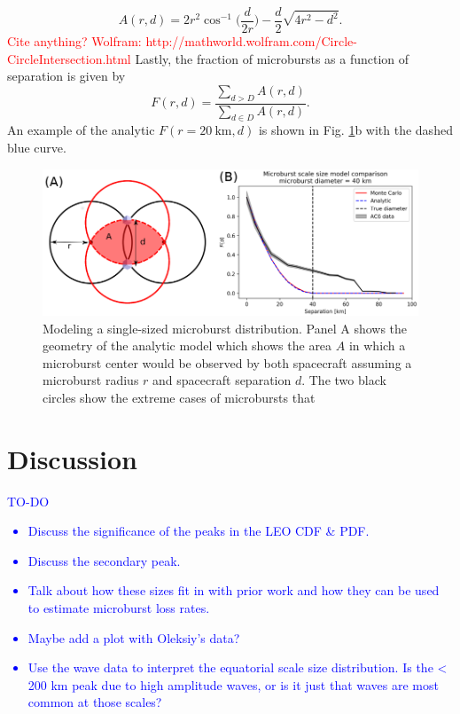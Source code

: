 \documentclass[draft]{agujournal2019}
\begin{document}
\begin{equation}
A(r, d) = 2r^2 \cos^{-1}{\Big( \frac{d}{2r} \Big)} - \frac{d}{2} \sqrt{4r^2 - d^2}.
\end{equation} \textcolor{red}{Cite anything? Wolfram: http://mathworld.wolfram.com/Circle-CircleIntersection.html} Lastly, the fraction of microbursts as a function of separation is given by 
\begin{equation}
F(r, d) = \frac{\sum_{d > D} A(r, d)}{\sum_{d \in D} A(r, d)}.
\end{equation} An example of the analytic $F(r=20 \ \mathrm{km}, d)$ is shown in Fig. \ref{fig5}b with the dashed blue curve. 



\begin{figure}
\includegraphics[width=\textwidth]{fig5.png}
\caption{Modeling a single-sized microburst distribution. Panel A shows the geometry of the analytic model which shows the area $A$ in which a microburst center would be observed by both spacecraft assuming a microburst radius $r$ and spacecraft separation $d$. The two black circles show the extreme cases of microbursts that } 
\label{fig5}
\end{figure}


\section{Discussion}
\textcolor{blue}{
TO-DO
\begin{itemize}
\item Discuss the significance of the peaks in the LEO CDF \& PDF.
\item Discuss the secondary peak.
\item Talk about how these sizes fit in with prior work and how they can be used to estimate microburst loss rates.
\item Maybe add a plot with Oleksiy's data?
\item Use the wave data to interpret the equatorial scale size distribution. Is the < 200 km peak due to high amplitude waves, or is it just that waves are most common at those scales?
\end{itemize}
}
\end{document}
